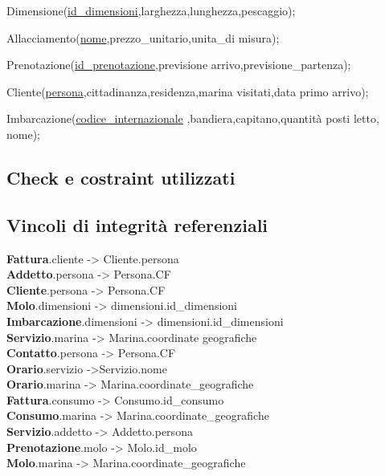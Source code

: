Dimensione(\underline{id\_dimensioni},larghezza,lunghezza,pescaggio);

Allacciamento(\underline{nome},prezzo\_unitario,unita\_di misura);

Prenotazione(\underline{id\_prenotazione},previsione arrivo,previsione\_partenza);

Cliente(\underline{persona},cittadinanza,residenza,marina visitati,data primo arrivo);

Imbarcazione(\underline{codice\_internazionale} ,bandiera,capitano,quantità posti letto, nome);

\subsection{Check e costraint utilizzati}



\subsection{Vincoli di integrità referenziali}

\textbf{Fattura}.cliente -> Cliente.persona\\
\textbf{Addetto}.persona -> Persona.CF\\
\textbf{Cliente}.persona -> Persona.CF\\
\textbf{Molo}.dimensioni -> dimensioni.id\_dimensioni\\
\textbf{Imbarcazione}.dimensioni -> dimensioni.id\_dimensioni\\
\textbf{Servizio}.marina -> Marina.coordinate geografiche\\
\textbf{Contatto}.persona -> Persona.CF\\
\textbf{Orario}.servizio ->Servizio.nome\\
\textbf{Orario}.marina -> Marina.coordinate\_geografiche\\
\textbf{Fattura}.consumo -> Consumo.id\_consumo\\
\textbf{Consumo}.marina -> Marina.coordinate\_geografiche\\
\textbf{Servizio}.addetto -> Addetto.persona\\
\textbf{Prenotazione}.molo -> Molo.id\_molo\\
\textbf{Molo}.marina -> Marina.coordinate\_geografiche\\
